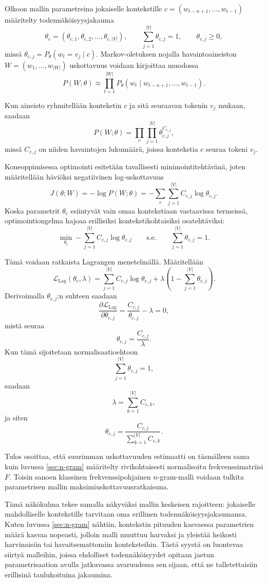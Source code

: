 Olkoon mallin parametreina jokaiselle kontekstille
\(c = (w_{t-n+1}, \ldots, w_{t-1})\) määritelty todennäköisyysjakauma
\[
  \theta_c = (\theta_{c,1}, \theta_{c,2}, \ldots, \theta_{c,|V|}),
  \qquad
  \sum_{j=1}^{|V|} \theta_{c,j} = 1,
  \qquad
  \theta_{c,j} \ge 0,
\]
missä \(\theta_{c,j} = P_\theta(w_t = v_j \mid c)\). Markov-oletuksen nojalla havaintoaineiston
\(W = (w_1, \ldots, w_{|W|})\) uskottavuus voidaan kirjoittaa muodossa
\[
  P(W;\theta)
  \approx
  \prod_{t=1}^{|W|}
  P_\theta(w_t \mid w_{t-n+1}, \ldots, w_{t-1}).
\]

Kun aineisto ryhmitellään kontekstin \(c\) ja sitä seuraavan tokenin \(v_j\)
mukaan, saadaan
\[
  P(W;\theta)
  =
  \prod_c \prod_{j=1}^{|V|}
  \theta_{c,j}^{C_{c,j}},
\]
missä \(C_{c,j}\) on niiden havaintojen lukumäärä, joissa kontekstia \(c\)
seuraa tokeni \(v_j\).

Koneoppimisessa optimointi esitetään tavallisesti minimointitehtävänä, joten
määritellään häviöksi negatiivinen log-uskottavuus
\[
  J(\theta;W)
  =
  -\log P(W;\theta)
  =
  -\sum_c \sum_{j=1}^{|V|}
  C_{c,j} \log \theta_{c,j}.
\]
Koska parametrit \(\theta_c\) esiintyvät vain omaa
kontekstiaan vastaavissa termeissä, optimointiongelma hajoaa erillisiksi
kontekstikohtaisiksi osatehtäviksi:
\[
  \min_{\theta_c}
  -\sum_{j=1}^{|V|} C_{c,j} \log \theta_{c,j}
  \qquad
  \text{s.e.}
  \qquad
  \sum_{j=1}^{|V|}\theta_{c,j} = 1.
\]

Tämä voidaan ratkaista Lagrangen menetelmällä. Määritellään
\[
  \mathcal{L}_{\mathrm{Lag}}(\theta_c,\lambda)
  =
  \sum_{j=1}^{|V|}
  C_{c,j}\log \theta_{c,j}
  +
  \lambda\left(1-\sum_{j=1}^{|V|}\theta_{c,j}\right).
\]
Derivoimalla \(\theta_{c,j}\):n suhteen saadaan
\[
  \frac{\partial \mathcal{L}_{\mathrm{Lag}}}{\partial \theta_{c,j}}
  =
  \frac{C_{c,j}}{\theta_{c,j}} - \lambda = 0,
\]
mistä seuraa
\[
  \theta_{c,j} = \frac{C_{c,j}}{\lambda}.
\]
Kun tämä sijoitetaan normalisaatioehtoon
\[
  \sum_{j=1}^{|V|}\theta_{c,j} = 1,
\]
saadaan
\[
  \lambda = \sum_{k=1}^{|V|} C_{c,k},
\]
ja siten
\[
  \theta_{c,j}
  =
  \frac{C_{c,j}}{\sum_{k=1}^{|V|} C_{c,k}}.
\]

Tulos osoittaa, että suurimman uskottavuuden estimaatti on täsmälleen sama kuin
luvussa \ref{sec:n-gram} määritelty rivikohtaisesti normalisoitu
frekvenssimatriisi \(F\). Toisin sanoen klassinen frekvenssipohjainen
\(n\)-gram-malli voidaan tulkita parametrisen mallin
maksimiuskottavuusratkaisuna.

Tämä näkökulma tekee samalla näkyväksi mallin keskeisen rajoitteen: jokaiselle
mahdolliselle kontekstille tarvitaan oma erillinen todennäköisyysjakaumansa.
Kuten luvussa \ref{sec:n-gram} nähtiin, kontekstin pituuden kasvaessa parametrien määrä kasvaa nopeasti, jolloin malli
muuttuu harvaksi ja yleistää heikosti harvinaisiin tai havaitsemattomiin
konteksteihin. Tästä syystä on luontevaa siirtyä malleihin, joissa ehdolliset
todennäköisyydet opitaan jaetun parametrisaation avulla jatkuvassa avaruudessa
sen sijaan, että ne talletettaisiin erillisinä taulukoituina jakaumina.

